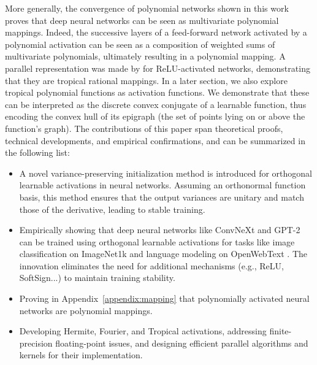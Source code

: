 \documentclass{article} %
\theoremstyle{plain}
\theoremstyle{definition}
\theoremstyle{remark}
\begin{document}
More generally, the convergence of polynomial networks shown in this work proves that deep neural networks can be seen as multivariate polynomial mappings. Indeed, the successive layers of a feed-forward network activated by a polynomial activation can be seen as a composition of weighted sums of multivariate polynomials, ultimately resulting in a polynomial mapping. A parallel representation was made by \cite{zhang2018tropical} for ReLU-activated networks, demonstrating that they are tropical rational mappings. In a later section, we also explore tropical polynomial functions as activation functions. We demonstrate that these can be interpreted as the discrete convex conjugate of a learnable function, thus encoding the convex hull of its epigraph (the set of points lying on or above the function's graph). The contributions of this paper span theoretical proofs, technical developments, and empirical confirmations, and can be summarized in the following list:
\begin{itemize}[leftmargin=1cm]%
    \item A novel variance-preserving initialization method is introduced for orthogonal learnable activations in neural networks. Assuming an orthonormal function basis, this method ensures that the output variances are unitary and match those of the derivative, leading to stable training.
    \item Empirically showing that deep neural networks like ConvNeXt \citep{liu2022convnet} and GPT-2 \citep{radford2019language} can be trained using orthogonal learnable activations for tasks like image classification on ImageNet1k \citep{deng2009imagenet} and language modeling on OpenWebText \citep{Gokaslan2019OpenWeb}. %
    The innovation eliminates the need for additional mechanisms (e.g., ReLU, SoftSign...) to maintain training stability.
    \item Proving in Appendix~\ref{appendix:mapping} that polynomially activated neural networks are polynomial mappings.%
    \item Developing Hermite, Fourier, and Tropical activations, addressing finite-precision floating-point issues, and designing efficient parallel algorithms and kernels for their implementation.
\end{itemize}
\end{document}
